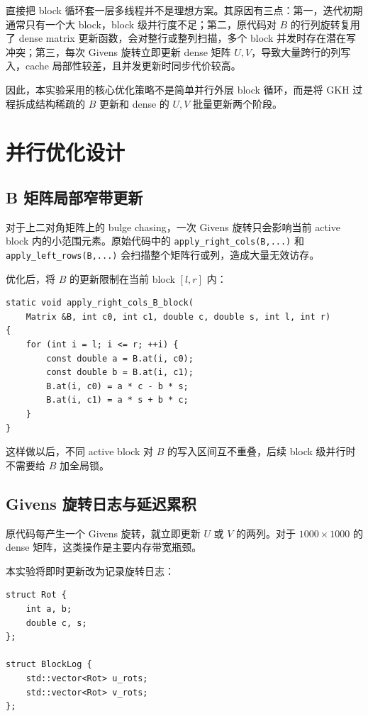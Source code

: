 ﻿\documentclass[UTF8,a4paper]{ctexart}
\begin{document}
直接把 block 循环套一层多线程并不是理想方案。其原因有三点：第一，迭代初期通常只有一个大 block，block 级并行度不足；第二，原代码对 $B$ 的行列旋转复用了 dense matrix 更新函数，会对整行或整列扫描，多个 block 并发时存在潜在写冲突；第三，每次 Givens 旋转立即更新 dense 矩阵 $U,V$，导致大量跨行的列写入，cache 局部性较差，且并发更新时同步代价较高。

因此，本实验采用的核心优化策略不是简单并行外层 block 循环，而是将 GKH 过程拆成结构稀疏的 $B$ 更新和 dense 的 $U,V$ 批量更新两个阶段。

\section{并行优化设计}

\subsection{B 矩阵局部窄带更新}

对于上二对角矩阵上的 bulge chasing，一次 Givens 旋转只会影响当前 active block 内的小范围元素。原始代码中的 \texttt{apply\_right\_cols(B,...)} 和 \texttt{apply\_left\_rows(B,...)} 会扫描整个矩阵行或列，造成大量无效访存。

优化后，将 $B$ 的更新限制在当前 block $[l,r]$ 内：

\begin{lstlisting}[caption={$B$ 的 block-local 右乘更新}]
static void apply_right_cols_B_block(
    Matrix &B, int c0, int c1, double c, double s, int l, int r)
{
    for (int i = l; i <= r; ++i) {
        const double a = B.at(i, c0);
        const double b = B.at(i, c1);
        B.at(i, c0) = a * c - b * s;
        B.at(i, c1) = a * s + b * c;
    }
}
\end{lstlisting}

这样做以后，不同 active block 对 $B$ 的写入区间互不重叠，后续 block 级并行时不需要给 $B$ 加全局锁。

\subsection{Givens 旋转日志与延迟累积}

原代码每产生一个 Givens 旋转，就立即更新 $U$ 或 $V$ 的两列。对于 $1000\times 1000$ 的 dense 矩阵，这类操作是主要内存带宽瓶颈。

本实验将即时更新改为记录旋转日志：

\begin{lstlisting}[caption={旋转日志结构}]
struct Rot {
    int a, b;
    double c, s;
};

struct BlockLog {
    std::vector<Rot> u_rots;
    std::vector<Rot> v_rots;
};
\end{lstlisting}
\end{document}
